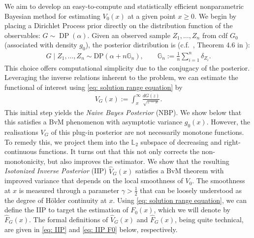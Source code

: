 We aim to develop an easy-to-compute and statistically efficient nonparametric Bayesian method for estimating \( V_0(x) \) at a given point \( x \geq 0 \). We begin by placing a Dirichlet Process prior directly on the distribution function of the observables: \( G \sim \operatorname{DP}(\alpha) \). Given an observed sample \( Z_1, \dots, Z_n \) from cdf \( G_0 \) (associated with density $g_0$), the posterior distribution is (c.f.\ \cite{59}, Theorem 4.6 in \cite{4}):
\begin{align}\label{eq: dirichlet posterior chapter3}
	G \mid Z_1,\ldots,Z_n \sim \text{DP}(\alpha + n \mathbb{G}_n), \quad \quad  \mathbb{G}_n := \frac{1}{n} \sum_{i=1}^n \delta_{Z_i}.
\end{align}
This choice offers computational simplicity due to the conjugacy of the posterior. Leveraging the inverse relations inherent to the problem, we can estimate the functional of interest using \eqref{eq: solution range equation} by
\begin{align}\label{eq: naive bayes chapter3}
	V_{\scriptscriptstyle{G}}(x) := \int_x^\infty \frac{dG(z)}{\sqrt{z - x}}.
\end{align}
This initial step yields the \textit{Naive Bayes Posterior} (NBP). We show below that this satisfies a BvM phenomenon with asymptotic variance \( g_0(x) \). However, the realisations \( V_{\scriptscriptstyle{G}} \) of this plug-in posterior are not necessarily monotone functions. To remedy this, we project them into the \( \mathbb{L}_2 \) subspace of decreasing and right-continuous functions. It turns out that this not only corrects the non-monotonicity, but also improves the estimator. We show that the resulting \textit{Isotonized Inverse Posterior} (IIP) $\hat{V}_{\scriptscriptstyle{G}}(x)$ satisfies a BvM theorem with improved variance that depends on the local smoothness of $V_0$. The smoothness at $x$ is measured through a parameter $\gamma > \frac{1}{2}$ that can be loosely understood as the degree of H\"{o}lder continuity at $x$. Using \eqref{eq: solution range equation}, we can define the IIP to target the estimation of $F_0(x)$, which we will denote by $\hat{F}_{\scriptscriptstyle{G}}(x)$. The formal definitions of $\hat{V}_{\scriptscriptstyle{G}}(x)$ and $\hat{F}_{\scriptscriptstyle{G}}(x)$, being quite technical, are given in \eqref{eq: IIP} and \eqref{eq: IIP F0} below, respectively. 

